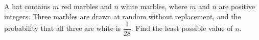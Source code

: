 A hat contains $m$ red marbles and $n$ white marbles, where $m$ and $n$ are positive integers. Three marbles are drawn at random without replacement, and the probability that all three are white is $\dfrac1{28}$. Find the least possible value of $n$.
